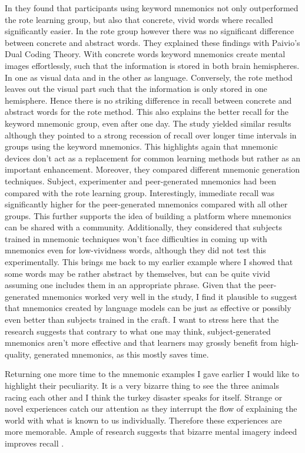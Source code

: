 In \cite{campos_2011} they found that participants using keyword mnemonics not only outperformed the rote learning group, but also that concrete, vivid words where recalled significantly easier. In the rote group however there was no significant difference between concrete and abstract words. They explained these findings with Paivio's Dual Coding Theory. With concrete words keyword mnemonics create mental images effortlessly, such that the information is stored in both brain hemispheres. In one as visual data and in the other as language. Conversely, the rote method leaves out the visual part such that the information is only stored in one hemisphere. Hence there is no striking difference in recall between concrete and abstract words for the rote method. This also explains the better recall for the keyword mnemonic group, even after one day. The study \cite{campos_2004} yielded similar results although they pointed to a strong recession of recall over longer time intervals in groups using the keyword mnemonics. This highlights again that mnemonic devices don't act as a replacement for common learning methods but rather as an important enhancement. Moreover, they compared different mnemonic generation techniques. Subject, experimenter and peer-generated mnemonics had been compared with the rote learning group. Interestingly, immediate recall was significantly higher for the peer-generated mnemonics compared with all other groups. This further supports the idea of building a platform where mnemonics can be shared with a community. Additionally, they considered that subjects trained in mnemonic techniques won't face difficulties in coming up with mnemonics even for low-vividness words, although they did not test this experimentally. This brings me back to my earlier example where I showed that some words may be rather abstract by themselves, but can be quite vivid assuming one includes them in an appropriate phrase. Given that the peer-generated mnemonics worked very well in the study, I find it plausible to suggest that mnemonics created by language models can be just as effective or possibly even better than subjects trained in the craft. I want to stress here that the research suggests that contrary to what one may think, subject-generated mnemonics aren't more effective and that learners may grossly benefit from high-quality, generated mnemonics, as this mostly saves time. 

Returning one more time to the mnemonic examples I gave earlier I would like to highlight their peculiarity. It is a very bizarre thing to see the three animals racing each other and I think the turkey disaster speaks for itself. Strange or novel experiences catch our attention as they interrupt the flow of explaining the world with what is known to us individually. Therefore these experiences are more memorable. Ample of research suggests that bizarre mental imagery indeed improves recall \cite{bizzare_obrian} \cite{mahdi2018effect}. 

